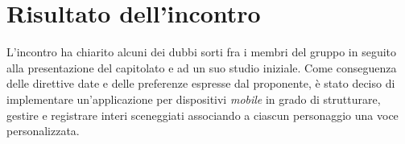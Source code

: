 \section{Risultato dell'incontro}
L'incontro ha chiarito alcuni dei dubbi sorti fra  i membri del gruppo in seguito alla presentazione del capitolato e ad un suo studio iniziale. Come conseguenza delle direttive date e delle preferenze espresse dal proponente, è stato deciso di implementare un'applicazione per dispositivi \textit{mobile} in grado di strutturare, gestire e registrare interi sceneggiati associando a ciascun personaggio una voce personalizzata.


